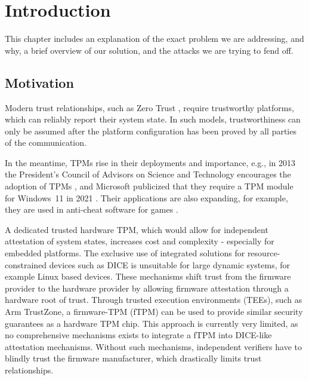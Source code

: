 
\chapter{Introduction}\label{chapter:introduction}

This chapter includes an explanation of the exact problem we are addressing, and why, a brief overview of our solution, and the attacks we are trying to fend off.


\section{Motivation}

Modern trust relationships, such as Zero Trust \cite{isaca2021}, require trustworthy platforms, which can reliably report their system state.
In such models, trustworthiness can only be assumed after the platform configuration has been proved by all parties of the communication.

In the meantime, TPMs rise in their deployments and importance, e.g., in 2013 the President's Council of Advisors on Science and Technology encourages the adoption of TPMs \cite{usa}, and Microsoft publicized that they require a TPM module for Windows~11 in 2021 \cite{win11req}.
Their applications are also expanding, for example, they are used in anti-cheat software for games \cite{valorant}.

A dedicated trusted hardware TPM, which would allow for independent attestation of system states, increases cost and complexity - especially for embedded platforms.
The exclusive use of integrated solutions for resource-constrained devices such as \ac{DICE} is unsuitable for large dynamic systems, for example Linux based devices.
These mechanisms shift trust from the firmware provider to the hardware provider by allowing firmware attestation through a hardware root of trust.
Through trusted execution environments (TEEs), such as Arm TrustZone, a firmware-TPM (fTPM) can be used to provide similar security guarantees as a hardware TPM chip.
This approach is currently very limited, as no comprehensive mechanisms exists to integrate a fTPM into DICE-like attestation mechanisms.
Without such mechanisms, independent verifiers have to blindly trust the firmware manufacturer, which drastically limits trust relationships.

